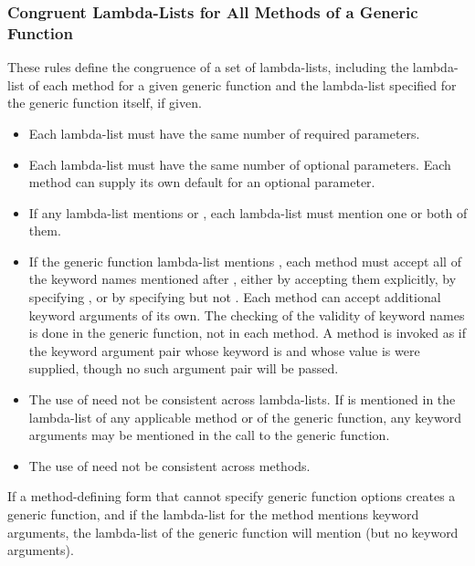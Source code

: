 \subsubsection{Congruent Lambda-Lists for All Methods of a Generic Function}
\label{Congruent-Lambda-Lists-for-All-Methods-of-a-Generic-Function-SECTION}

These rules define the congruence of a set of lambda-lists, including the
lambda-list of each method for a given generic function and the
lambda-list specified for the generic function itself, if given.

\begin{itemize}

\item Each lambda-list must have the same number of required
parameters.

\item Each lambda-list must have the same number of optional
parameters.  Each method can supply its own default for an optional
parameter.

\item If any lambda-list mentions  or , each
lambda-list must mention one or both of them.

\item If the generic function lambda-list mentions , each
method must accept all of the keyword names mentioned after ,
either by accepting them explicitly, by specifying 
, or by specifying  but not .
Each method can accept additional keyword arguments of its own.  The
checking of the validity of keyword names is done in the generic
function, not in each method. A method is invoked as if the keyword
argument pair whose  keyword is  and whose value
is  were supplied, though no such argument pair will be passed.

\item The use of  need not be consistent
across lambda-lists.  If  is mentioned in 
the lambda-list of any applicable method or of the generic function,
any keyword arguments may be mentioned in the call to the
generic function.

\item The use of  need not be consistent across methods.
\end{itemize}

If a method-defining form that cannot specify generic function options
creates a generic function, and if the lambda-list for the method
mentions keyword arguments, the lambda-list of the generic function
will mention  (but no keyword arguments).

